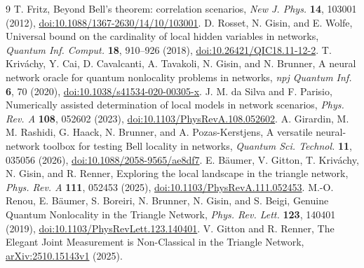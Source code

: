 \begin{thebibliography}{9}
 T. Fritz, Beyond Bell's theorem: correlation scenarios,
\emph{New J. Phys.} \textbf{14}, 103001 (2012),
\href{https://doi.org/10.1088/1367-2630/14/10/103001}{doi:10.1088/1367-2630/14/10/103001}.
 D. Rosset, N. Gisin, and E. Wolfe, Universal bound on the
cardinality of local hidden variables in networks,
\emph{Quantum Inf. Comput.} \textbf{18}, 910--926 (2018),
\href{https://doi.org/10.26421/QIC18.11-12-2}{doi:10.26421/QIC18.11-12-2}.
 T. Kriv\'achy, Y. Cai, D. Cavalcanti, A. Tavakoli, N. Gisin,
and N. Brunner, A neural network oracle for quantum nonlocality problems in
networks, \emph{npj Quantum Inf.} \textbf{6}, 70 (2020),
\href{https://doi.org/10.1038/s41534-020-00305-x}{doi:10.1038/s41534-020-00305-x}.
 J. M. da Silva and F. Parisio, Numerically assisted
determination of local models in network scenarios, \emph{Phys. Rev. A}
\textbf{108}, 052602 (2023),
\href{https://doi.org/10.1103/PhysRevA.108.052602}{doi:10.1103/PhysRevA.108.052602}.
 A. Girardin, M. M. Rashidi, G. Haack, N. Brunner, and
A. Pozas-Kerstjens, A versatile neural-network toolbox for testing Bell
locality in networks, \emph{Quantum Sci. Technol.} \textbf{11}, 035056 (2026),
\href{https://doi.org/10.1088/2058-9565/ae8df7}{doi:10.1088/2058-9565/ae8df7}.
 E. B\"aumer, V. Gitton, T. Kriv\'achy, N. Gisin, and R. Renner,
Exploring the local landscape in the triangle network,
\emph{Phys. Rev. A} \textbf{111}, 052453 (2025),
\href{https://doi.org/10.1103/PhysRevA.111.052453}{doi:10.1103/PhysRevA.111.052453}.
 M.-O. Renou, E. B\"aumer, S. Boreiri, N. Brunner, N. Gisin,
and S. Beigi, Genuine Quantum Nonlocality in the Triangle Network,
\emph{Phys. Rev. Lett.} \textbf{123}, 140401 (2019),
\href{https://doi.org/10.1103/PhysRevLett.123.140401}{doi:10.1103/PhysRevLett.123.140401}.
 V. Gitton and R. Renner, The Elegant Joint Measurement is
Non-Classical in the Triangle Network,
\href{https://arxiv.org/abs/2510.15143v1}{arXiv:2510.15143v1} (2025).
\end{thebibliography}

